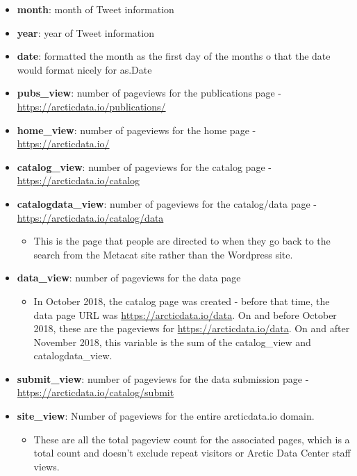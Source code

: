 \documentclass[]{article}
\providecommand{\tightlist}{%
  \setlength{\itemsep}{0pt}\setlength{\parskip}{0pt}}
\begin{document}
\begin{itemize}
\tightlist
\item
  \textbf{month}: month of Tweet information
\item
  \textbf{year}: year of Tweet information
\item
  \textbf{date}: formatted the month as the first day of the months o
  that the date would format nicely for as.Date
\item
  \textbf{pubs\_view}: number of pageviews for the publications page -
  \url{https://arcticdata.io/publications/}
\item
  \textbf{home\_view}: number of pageviews for the home page -
  \url{https://arcticdata.io/}
\item
  \textbf{catalog\_view}: number of pageviews for the catalog page -
  \url{https://arcticdata.io/catalog}
\item
  \textbf{catalogdata\_view}: number of pageviews for the catalog/data
  page - \url{https://arcticdata.io/catalog/data}

  \begin{itemize}
  \tightlist
  \item
    This is the page that people are directed to when they go back to
    the search from the Metacat site rather than the Wordpress site.
  \end{itemize}
\item
  \textbf{data\_view}: number of pageviews for the data page

  \begin{itemize}
  \tightlist
  \item
    In October 2018, the catalog page was created - before that time,
    the data page URL was \url{https://arcticdata.io/data}. On and
    before October 2018, these are the pageviews for
    \url{https://arcticdata.io/data}. On and after November 2018, this
    variable is the sum of the catalog\_view and catalogdata\_view.
  \end{itemize}
\item
  \textbf{submit\_view}: number of pageviews for the data submission
  page - \url{https://arcticdata.io/catalog/submit}
\item
  \textbf{site\_view}: Number of pageviews for the entire arcticdata.io
  domain.

  \begin{itemize}
  \tightlist
  \item
    These are all the total pageview count for the associated pages,
    which is a total count and doesn't exclude repeat visitors or Arctic
    Data Center staff views.
  \end{itemize}
\end{itemize}
\end{document}
